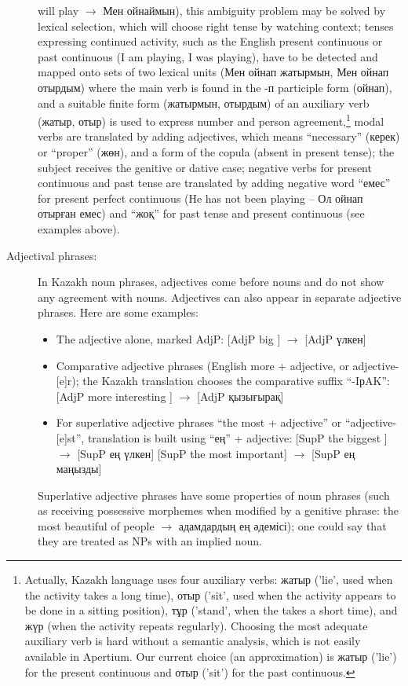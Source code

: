 \documentclass[11pt]{article}
\begin{document}
\begin{description}
  will play $\rightarrow$ Мен ойнаймын), this ambiguity problem may be solved by lexical selection, 
  which will choose right tense by watching context; tenses expressing continued activity, such as the 
  English present continuous or past continuous (I am playing, I was playing), have to be detected and 
  mapped onto sets of two lexical units (Мен ойнап жатырмын, Мен ойнап отырдым) where the main verb is 
  found in the -п participle form (ойнап), and a suitable finite form  (жатырмын, отырдым) of an auxiliary 
  verb (жатыр, отыр) is used to express number and person agreement,\footnote{Actually, Kazakh language uses four auxiliary verbs: жатыр ('lie', 
      used when the activity takes a long time), отыр ('sit', used when the activity appears to be done in a sitting position), тұр ('stand', 
      when the takes a short time), and жүр (when the activity repeats regularly). Choosing the most adequate auxiliary verb is 
      hard without a semantic analysis, which is not easily available in Apertium. Our current choice (an approximation) 
      is жатыр ('lie') for the present continuous and отыр ('sit') for the past continuous.} 
  modal verbs are translated by adding adjectives, which means ``necessary'' (керек) or ``proper'' (жөн), 
  and a form of the copula (absent in present tense); the subject receives the genitive or dative case; negative 
  verbs for present continuous and past tense are translated by adding negative word ``емес'' for present 
  perfect continuous (He has not been playing -- Ол ойнап отырған емес) and  ``жоқ'' for past tense and 
  present continuous (see examples above).
\item[Adjectival phrases:] In Kazakh noun phrases, adjectives come before nouns and do not show any agreement 
  with nouns.  Adjectives can also appear in separate adjective phrases. Here are some examples:
\begin{itemize}
\item The adjective alone, marked AdjP: [AdjP big ] $\rightarrow$ [AdjP үлкен] 
\item Comparative adjective phrases  (English more + adjective, or adjective-[e]r); the Kazakh translation 
   chooses the comparative suffix ``-{I}р{A}{K}'': [AdjP  more  interesting ]  $\rightarrow$ [AdjP қызығырақ]
\item For superlative adjective phrases  ``the most + adjective''  or ``adjective-[e]st'', translation 
   is built using ``ең'' + adjective:  [SupP  the biggest ]  $\rightarrow$ [SupP ең үлкен] 
   [SupP  the most important]   $\rightarrow$ [SupP ең маңызды]
\end{itemize}
Superlative adjective phrases have some properties of noun phrases (such as receiving possessive morphemes when 
modified by a genitive phrase: the most beautiful of people $\rightarrow$ адамдардың ең әдемісі); one could 
say that they are treated as NPs with an implied noun.
\end{description}
\end{document}

